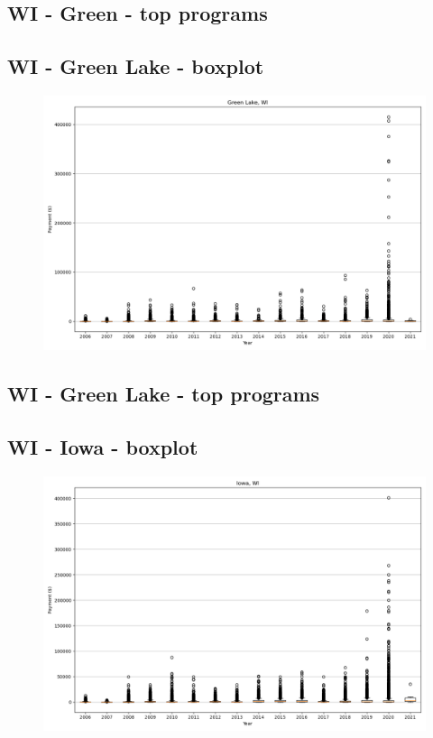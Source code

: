\subsection*{WI - Green - top programs}

\newpage
\subsection*{WI - Green Lake - boxplot}
\begin{figure}[h]
\centering
\includegraphics[width=7in]{../output/boxplots/counties/Green Lake-WI_boxplot.png}
\end{figure}


\subsection*{WI - Green Lake - top programs}

\newpage
\subsection*{WI - Iowa - boxplot}
\begin{figure}[h]
\centering
\includegraphics[width=7in]{../output/boxplots/counties/Iowa-WI_boxplot.png}
\end{figure}


